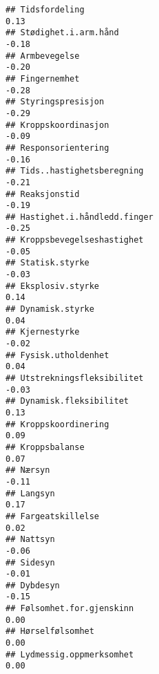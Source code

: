 \documentclass[
]{article}
\begin{document}
\begin{verbatim}
## Tidsfordeling                                                                     0.13
## Stødighet.i.arm.hånd                                                             -0.18
## Armbevegelse                                                                     -0.20
## Fingernemhet                                                                     -0.28
## Styringspresisjon                                                                -0.29
## Kroppskoordinasjon                                                               -0.09
## Responsorientering                                                               -0.16
## Tids..hastighetsberegning                                                        -0.21
## Reaksjonstid                                                                     -0.19
## Hastighet.i.håndledd.finger                                                      -0.25
## Kroppsbevegelseshastighet                                                        -0.05
## Statisk.styrke                                                                   -0.03
## Eksplosiv.styrke                                                                  0.14
## Dynamisk.styrke                                                                   0.04
## Kjernestyrke                                                                     -0.02
## Fysisk.utholdenhet                                                                0.04
## Utstrekningsfleksibilitet                                                        -0.03
## Dynamisk.fleksibilitet                                                            0.13
## Kroppskoordinering                                                                0.09
## Kroppsbalanse                                                                     0.07
## Nærsyn                                                                           -0.11
## Langsyn                                                                           0.17
## Fargeatskillelse                                                                  0.02
## Nattsyn                                                                          -0.06
## Sidesyn                                                                          -0.01
## Dybdesyn                                                                         -0.15
## Følsomhet.for.gjenskinn                                                           0.00
## Hørselfølsomhet                                                                   0.00
## Lydmessig.oppmerksomhet                                                           0.00

\end{verbatim}
\end{document}
